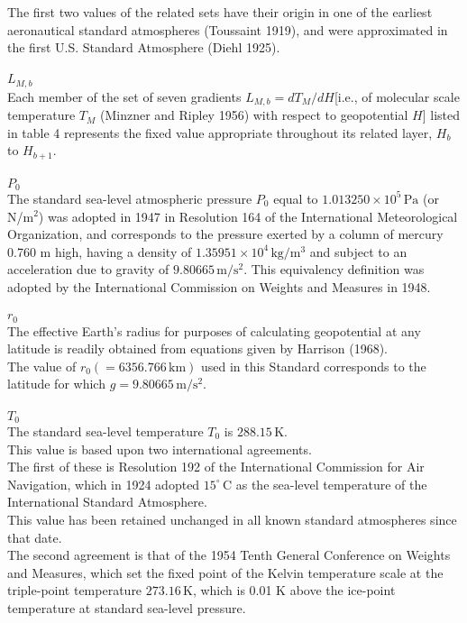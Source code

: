 \documentclass{article}
\begin{document}
The first two values of the related sets have their origin in one of the earliest aeronautical standard atmospheres (Toussaint 1919), and were approximated in the first U.S. Standard Atmosphere (Diehl 1925).\\
\\$L_{M,b}$\\
Each member of the set of seven gradients $L_{M,b} = dT_M/dH$[i.e., of molecular scale temperature $T_M$ (Minzner and Ripley 1956) with respect to geopotential $H$] listed in table 4 represents the fixed value appropriate throughout its related layer, $H_b$ to $H_{b+1}$.\\
\\$P_0$\\
The standard sea-level atmospheric pressure $P_0$ equal to $1.013250 \times 10^{5} \, \mathrm{Pa}$ (or N/m$^2$) was adopted in 1947 in Resolution 164 of the International Meteorological Organization, and corresponds to the pressure exerted by a column of mercury 0.760 m high, having a density of $1.35951 \times 10^{4} \, \mathrm{kg/m^3}$ and subject to an acceleration due to gravity of $9.80665 \, \mathrm{m/s^2}$.
This equivalency definition was adopted by the International Commission on Weights and Measures in 1948.\\
\\$r_0$\\
The effective Earth's radius for purposes of calculating geopotential at any latitude is readily obtained from equations given by Harrison (1968).\\
The value of $r_0 (= 6356.766 \, \mathrm{km})$ used in this Standard corresponds to the latitude for which $g = 9.80665 \, \mathrm{m/s^2}$.\\
\\$T_0$\\
The standard sea-level temperature $T_0$ is $288.15 \, \mathrm{K}$.\\
This value is based upon two international agreements.\\
The first of these is Resolution 192 of the International Commission for Air Navigation, which in 1924 adopted $15^\circ \, \mathrm{C}$ as the sea-level temperature of the International Standard Atmosphere.\\
This value has been retained unchanged in all known standard atmospheres since that date.\\
The second agreement is that of the 1954 Tenth General Conference on Weights and Measures, which set the fixed point of the Kelvin temperature scale at the triple-point temperature $273.16 \, \mathrm{K}$, which is 0.01 K above the ice-point temperature at standard sea-level pressure.\\
\end{document}
